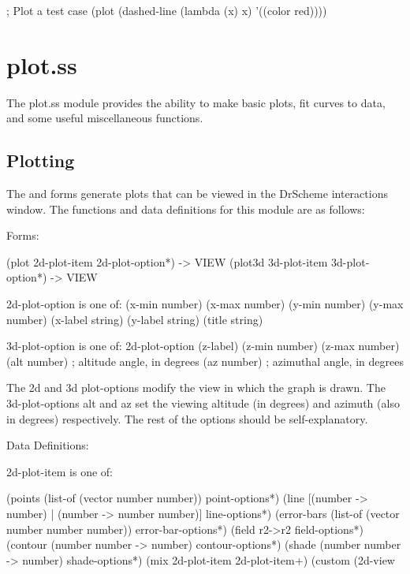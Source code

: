 \documentclass{article}
\begin{document}
{\begin{schemedisplay}
; Plot a test case
(plot (dashed-line (lambda (x) x) '((color red))))
\end{schemedisplay}

\pagebreak

\section{plot.ss}

The plot.ss module provides the ability to make basic plots, fit curves to data, and some useful miscellaneous functions.

\subsection{Plotting}


The  and  forms generate plots that can be viewed in the DrScheme interactions window. The functions and data definitions for this  module are as follows:



\begin{schemedisplay}

       
Forms:
       
 (plot 2d-plot-item 2d-plot-option*) -> VIEW
 (plot3d 3d-plot-item 3d-plot-option*) -> VIEW
     
2d-plot-option is one of:
 (x-min number)
 (x-max number)
 (y-min number)
 (y-max number)
 (x-label string)
 (y-label string)
 (title string)
     
3d-plot-option is one of:
 2d-plot-option
 (z-label)
 (z-min number)
 (z-max number)
 (alt number)    ; altitude angle, in degrees
 (az number)     ; azimuthal angle, in degrees
     
\end{schemedisplay}



The 2d and 3d plot-options modify the view in which the graph is drawn. The 3d-plot-options alt and az set the viewing altitude (in degrees) and azimuth (also in degrees) respectively. The rest of the options should be self-explanatory.



\begin{schemedisplay}
Data Definitions:
     
2d-plot-item is one of:

 (points (list-of (vector number number)) point-options*)
 (line [(number -> number) | (number -> number number)] line-options*)
 (error-bars (list-of (vector number number number)) error-bar-options*)
 (field r2->r2 field-options*)
 (contour (number number -> number) contour-options*)
 (shade (number number -> number) shade-options*)
 (mix 2d-plot-item 2d-plot-item+)
 (custom (2d-view%
     

\end{schemedisplay}}
\end{document}
